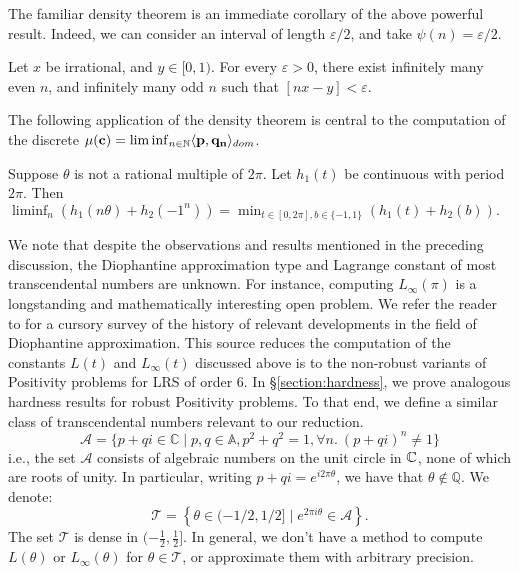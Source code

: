 The familiar density theorem is an immediate corollary of the above powerful result. Indeed, we can consider an interval of length $\varepsilon/2$, and take $\psi(n) = \varepsilon/2$.
\begin{lemma}
\label{lemma:density}
Let $x$ be irrational, and $y \in [0, 1)$. For every $\varepsilon > 0$, there exist infinitely many even $n$, and infinitely many odd $n$ such that $[nx - y] < \varepsilon$.
\end{lemma}

The following application of the density theorem is central to the computation of the discrete $\mu(\mathbf{c}) = \liminf_{n\in \mathbb{N}}\langle\mathbf{p}, \mathbf{q_n}\rangle_{dom}$.
\begin{lemma}
\label{eq:liminfmin}
Suppose $\theta$ is not a rational multiple of $2\pi$. Let $h_1(t)$ be continuous with period $2\pi$. Then
$
\liminf_n \left(h_1(n\theta) + h_2(-1^n)\right) = \min_{t \in [0, 2\pi], b\in \{-1, 1\}} \left(h_1(t) + h_2(b)\right).
$
\end{lemma}

We note that despite the observations and results mentioned in the preceding discussion, the Diophantine approximation type and Lagrange constant of most transcendental numbers are unknown. For instance, computing $L_\infty(\pi)$ is a longstanding and mathematically interesting open problem. We refer the reader to \cite[Section 5]{joeljames3} for a cursory survey of the history of relevant developments in the field of Diophantine approximation. This source reduces the computation of the constants $L(t)$ and $L_\infty(t)$ discussed above is to the non-robust variants of Positivity problems for LRS of order 6. In \S\ref{section:hardness}, we prove analogous hardness results for robust Positivity problems. To that end, we define a similar class of transcendental numbers relevant to our reduction.
\begin{equation}
\mathcal A=\{p+q i \in \mathbb{C} \mid p,q \in \mathbb{A}, p^2+q^2=1, \forall n.~(p + qi)^n \ne 1\}
\end{equation}
i.e., the set $\mathcal A$ consists of algebraic numbers on the unit circle in $\mathbb{C}$, none of which are roots of unity. In particular, writing $p+q i= e^{i 2 \pi \theta}$, we have that $\theta \notin \mathbb{Q}$. We denote:
\begin{equation}
\label{eq:keyset}
\mathcal{T} = \left\{ \theta \in (- 1/2, 1/2] \mid e^{2 \pi i \theta} \in \mathcal{A}\right\}.
\end{equation}
The set $\mathcal{T}$ is dense in $(- \frac 1 2, \frac 1 2]$. In general, we don't have a method to compute $L(\theta)$ or $L_\infty(\theta)$ for $\theta \in \mathcal{T}$, or approximate them with arbitrary precision.

